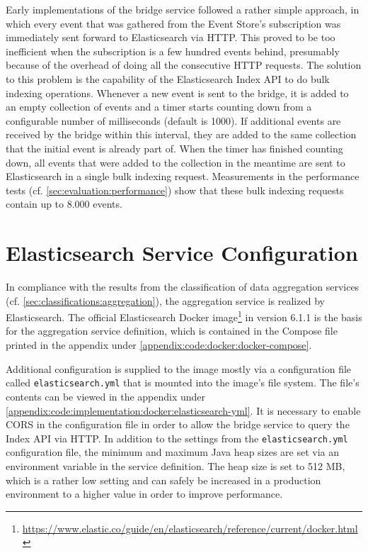 Early implementations of the bridge service followed a rather simple approach, in which every event that was gathered from the Event Store's subscription was immediately sent forward to Elasticsearch via \ac{HTTP}.
This proved to be too inefficient when the subscription is a few hundred events behind, presumably because of the overhead of doing all the consecutive \ac{HTTP} requests.
The solution to this problem is the capability of the Elasticsearch Index \ac{API} to do bulk indexing operations.
Whenever a new event is sent to the bridge, it is added to an empty collection of events and a timer starts counting down from a configurable number of milliseconds (default is 1000).
If additional events are received by the bridge within this interval, they are added to the same collection that the initial event is already part of.
When the timer has finished counting down, all events that were added to the collection in the meantime are sent to Elasticsearch in a single bulk indexing request.
Measurements in the performance tests (cf. \cref{sec:evaluation:performance}) show that these bulk indexing requests contain up to 8.000 events.

\section{Elasticsearch Service Configuration}
\label{sec:implementation:aggregation}

In compliance with the results from the classification of data aggregation services (cf. \cref{sec:classifications:aggregation}), the aggregation service is realized by Elasticsearch.
The official Elasticsearch Docker image\footnote{\url{https://www.elastic.co/guide/en/elasticsearch/reference/current/docker.html}} in version 6.1.1 is the basis for the aggregation service definition, which is contained in the Compose file printed in the appendix under \cref{appendix:code:docker:docker-compose}.

Additional configuration is supplied to the image mostly via a configuration file called \texttt{elasticsearch.yml} that is mounted into the image's file system.
The file's contents can be viewed in the appendix under \cref{appendix:code:implementation:docker:elasticsearch-yml}.
It is necessary to enable \ac{CORS} in the configuration file in order to allow the bridge service to query the Index \ac{API} via \ac{HTTP}.
In addition to the settings from the \texttt{elasticsearch.yml} configuration file, the minimum and maximum Java heap sizes are set via an environment variable in the service definition.
The heap size is set to 512 MB, which is a rather low setting and can safely be increased in a production environment to a higher value in order to improve performance.

